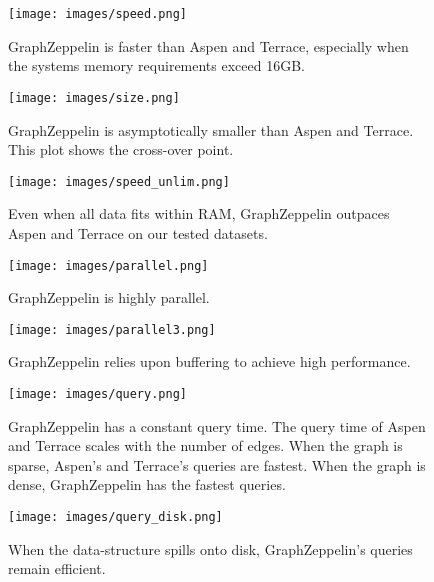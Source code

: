 \begin{figure}
\begin{center}
\texttt{[image: images/speed.png]}
\end{center} 
\caption{GraphZeppelin is faster than Aspen and Terrace, especially when the systems memory requirements exceed 16GB.
}
\end{figure}

\begin{figure}
\begin{center}
\texttt{[image: images/size.png]}
\end{center} 
\caption{GraphZeppelin is asymptotically smaller than Aspen and Terrace. This plot shows the cross-over point.
}
\end{figure}

\begin{figure}
\begin{center}
\texttt{[image: images/speed\_unlim.png]}
\end{center} 
\caption{Even when all data fits within RAM, GraphZeppelin outpaces Aspen and Terrace on our tested datasets.
}
\end{figure}

\begin{figure}
\begin{center}
\texttt{[image: images/parallel.png]}
\end{center} 
\caption{GraphZeppelin is highly parallel.
}
\end{figure}

\begin{figure}
\begin{center}
\texttt{[image: images/parallel3.png]}
\end{center} 
\caption{GraphZeppelin relies upon buffering to achieve high performance.
}
\end{figure}

\begin{figure}
\begin{center}
\texttt{[image: images/query.png]}
\end{center} 
\caption{GraphZeppelin has a constant query time. The query time of Aspen and Terrace scales with the number of edges. When the graph is sparse, Aspen's and Terrace's queries are fastest. When the graph is dense, GraphZeppelin has the fastest queries.
}
\end{figure}

\begin{figure}
\begin{center}
\texttt{[image: images/query\_disk.png]}
\end{center} 
\caption{When the data-structure spills onto disk, GraphZeppelin's queries remain efficient.
}
\end{figure}
